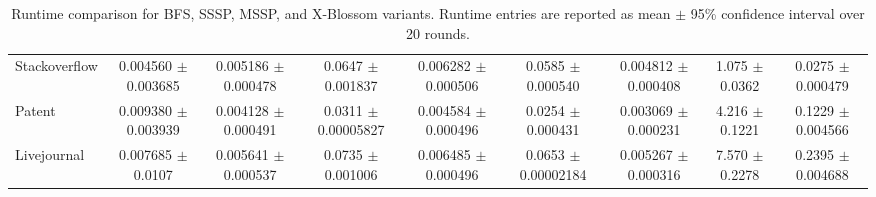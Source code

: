 \begin{table}[H]
{\begin{tabular}{l|cc|cc|cc|cc}
Stackoverflow & 0.004560 {\tiny $\pm$ 0.003685} & 0.005186 {\tiny $\pm$ 0.000478} & 0.0647 {\tiny $\pm$ 0.001837} & 0.006282 {\tiny $\pm$ 0.000506} & 0.0585 {\tiny $\pm$ 0.000540} & 0.004812 {\tiny $\pm$ 0.000408} & 1.075 {\tiny $\pm$ 0.0362} & 0.0275 {\tiny $\pm$ 0.000479} \\
Patent & 0.009380 {\tiny $\pm$ 0.003939} & 0.004128 {\tiny $\pm$ 0.000491} & 0.0311 {\tiny $\pm$ 0.00005827} & 0.004584 {\tiny $\pm$ 0.000496} & 0.0254 {\tiny $\pm$ 0.000431} & 0.003069 {\tiny $\pm$ 0.000231} & 4.216 {\tiny $\pm$ 0.1221} & 0.1229 {\tiny $\pm$ 0.004566} \\
Livejournal & 0.007685 {\tiny $\pm$ 0.0107} & 0.005641 {\tiny $\pm$ 0.000537} & 0.0735 {\tiny $\pm$ 0.001006} & 0.006485 {\tiny $\pm$ 0.000496} & 0.0653 {\tiny $\pm$ 0.00002184} & 0.005267 {\tiny $\pm$ 0.000316} & 7.570 {\tiny $\pm$ 0.2278} & 0.2395 {\tiny $\pm$ 0.004688} \\
\bottomrule
\end{tabular}
}
\captionsetup{skip=4pt}
\caption{Runtime comparison for BFS, SSSP, MSSP, and X-Blossom variants. Runtime entries are reported as mean $\pm$ 95\% confidence interval over 20 rounds.}
\label{tab:runtime-four-ci}
\vspace{-4pt}
\end{table}
